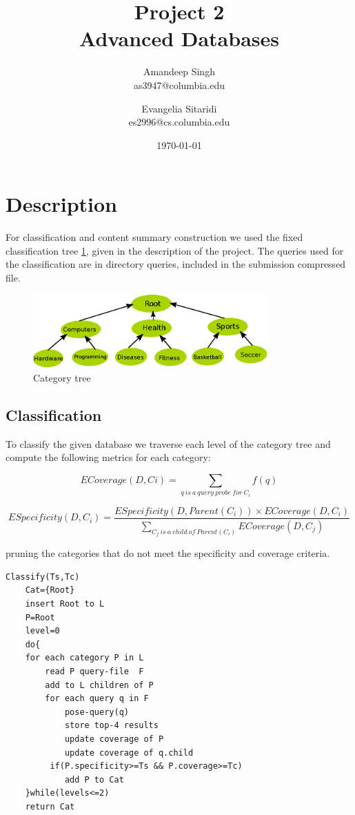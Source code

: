 \documentclass[11pt]{article}
\title{Project 2 \\ Advanced Databases \\}
\author{
Amandeep  Singh\\as3947@columbia.edu
\and
Evangelia  Sitaridi \\ es2996@cs.columbia.edu
}
\date{\today}
\begin{document}
\maketitle

\section{Description}
For classification and content summary construction we used the fixed classification tree \ref{fig:tree}, given in the description of the project. The queries
used for the classification are in directory queries, included in the submission compressed file.

\begin{figure}[htb!]
\centering
\includegraphics[width=90mm]{cattree}
\caption{Category tree}
\label{fig:tree}
\end{figure}

\subsection{Classification}
To classify the given database we traverse each level of the category tree and compute the following metrics for each category:

\[ECoverage(D,Ci)=\sum_{q \ is \ a \ query \ probe \ for \ C_i}{f(q)} \]

\[ESpecificity(D, C_i ) = \frac{ESpecificity(D, Parent(C_i )) \times ECoverage(D, C_i )} {\sum_{C_j \  is \ a \ child \ of \ Parent(C_i)} {ECoverage(D,C_j)}} \]

pruning the categories that do not meet the specificity and coverage criteria.

\begin{verbatim}
Classify(Ts,Tc)
    Cat={Root}
    insert Root to L
    P=Root
    level=0
    do{
    for each category P in L
        read P query-file  F
        add to L children of P
        for each query q in F
            pose-query(q)
            store top-4 results
            update coverage of P 
            update coverage of q.child
         if(P.specificity>=Ts && P.coverage>=Tc)
            add P to Cat
    }while(levels<=2)
    return Cat
\end{verbatim}
\end{document}
